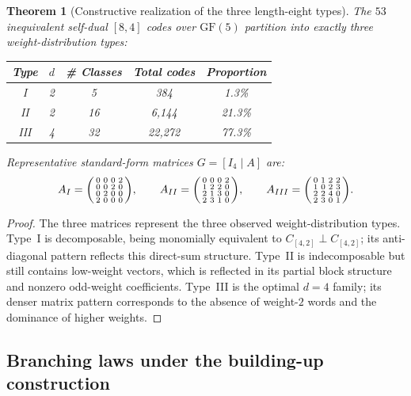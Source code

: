 \documentclass[12pt]{article}
\newtheorem{theorem}{Theorem}[section]
\newcommand{\GF}[1]{\ensuremath{\mathrm{GF}(#1)}}
\begin{document}
\begin{theorem}[Constructive realization of the three length-eight types]
\label{thm:constructive-84}
The $53$ inequivalent self-dual $[8,4]$ codes over $\GF{5}$ partition into exactly three weight-distribution types:
\begin{center}
\begin{tabular}{ccccc}
\toprule
Type & $d$ & \# Classes & Total codes & Proportion \\
\midrule
I & 2 & 5 & 384 & 1.3\% \\
II & 2 & 16 & 6{,}144 & 21.3\% \\
III & 4 & 32 & 22{,}272 & 77.3\% \\
\bottomrule
\end{tabular}
\end{center}
Representative standard-form matrices $G=[I_4 \mid A]$ are:
\[
A_I =
\begin{psmallmatrix}
0&0&0&2\\
0&0&2&0\\
0&2&0&0\\
2&0&0&0
\end{psmallmatrix},
\qquad
A_{II} =
\begin{psmallmatrix}
0&0&0&2\\
1&2&2&0\\
2&1&3&0\\
2&3&1&0
\end{psmallmatrix},
\qquad
A_{III} =
\begin{psmallmatrix}
0&1&2&2\\
1&0&2&3\\
2&2&4&0\\
2&3&0&1
\end{psmallmatrix}.
\]
\end{theorem}

\begin{proof}
The three matrices represent the three observed weight-distribution types. Type~I is decomposable, being monomially equivalent to $C_{[4,2]} \perp C_{[4,2]}$; its anti-diagonal pattern reflects this direct-sum structure. Type~II is indecomposable but still contains low-weight vectors, which is reflected in its partial block structure and nonzero odd-weight coefficients. Type~III is the optimal $d=4$ family; its denser matrix pattern corresponds to the absence of weight-$2$ words and the dominance of higher weights.
\end{proof}

\subsection{Branching laws under the building-up construction}
\end{document}
